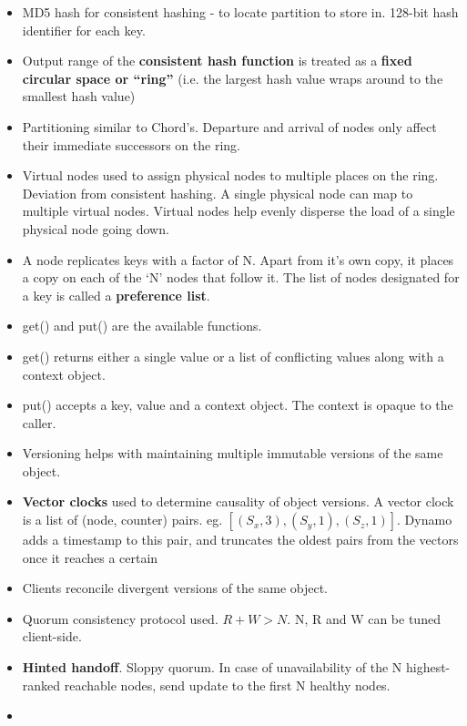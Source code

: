 \documentclass[parskip=half]{scrartcl}
\begin{document}
    \begin{itemize}
        \item
        MD5 hash for consistent hashing - to locate partition to store in. 128-bit hash identifier for each key.
        \item
        Output range of the \textbf{consistent hash function} is treated as a \textbf{fixed circular space or “ring”} (i.e. the largest hash value wraps around to the smallest hash value)
        \item
        Partitioning similar to Chord's. Departure and arrival of nodes only affect their immediate successors on the ring.
        \item
        Virtual nodes used to assign physical nodes to multiple places on the ring. Deviation from consistent hashing. A single physical node can map to multiple virtual nodes. Virtual nodes help evenly disperse the load of a single physical node going down.
        \item
        A node replicates keys with a factor of N. Apart from it's own copy, it places a copy on each of the `N' nodes that follow it. The list of nodes designated for a key is called a \textbf{preference list}.
        \item
        get() and put() are the available functions.
        \item
        get() returns either a single value or a list of conflicting values along with a context object.
        \item
        put() accepts a key, value and a context object. The context is opaque to the caller.
        \item
        Versioning helps with maintaining multiple immutable versions of the same object.
        \item
        \textbf{Vector clocks} used to determine causality of object versions. A vector clock is a list of (node, counter) pairs. eg. $[(S_x,3), (S_y, 1), (S_z, 1)]$. Dynamo adds a timestamp to this pair, and truncates the oldest pairs from the vectors once it reaches a certain
        \item
        Clients reconcile divergent versions of the same object.
        \item
        Quorum consistency protocol used. $R + W > N$. N, R and W can be tuned client-side.
        \item
        \textbf{Hinted handoff}. Sloppy quorum. In case of unavailability of the N highest-ranked reachable nodes, send update to the first N healthy nodes.
        \item

\end{itemize}
\end{document}
